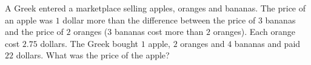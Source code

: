 A Greek entered a marketplace selling apples, oranges and bananas. The price of an apple was $1$ dollar more than the difference between the price of $3$ bananas and the price of $2$ oranges ($3$ bananas cost more than $2$ oranges). Each orange cost $2.75$ dollars. The Greek bought $1$ apple, $2$ oranges and $4$ bananas and paid $22$ dollars. What was the price of the apple?
